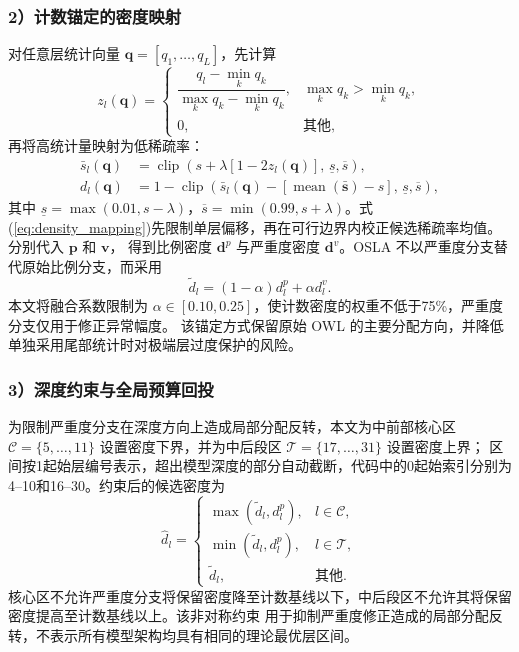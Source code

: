 \documentclass[UTF8,fontset=fandol]{ctexart}
\begin{document}
\subsubsection*{2）计数锚定的密度映射}

对任意层统计向量 $\bm q=[q_1,\ldots,q_L]$，先计算
\begin{equation}
z_l(\bm q)=
\begin{cases}
\dfrac{q_l-\min_k q_k}{\max_k q_k-\min_k q_k},
& \max_k q_k>\min_k q_k,\\[6pt]
0,&\text{其他},
\end{cases}
\label{eq:minmax}
\end{equation}
再将高统计量映射为低稀疏率：
\begin{equation}
\begin{aligned}
\bar s_l(\bm q)
&=\operatorname{clip}\!\left(
s+\lambda[1-2z_l(\bm q)],\,
\underline s,\overline s\right),\\
d_l(\bm q)&=
1-\operatorname{clip}\!\left(
\bar s_l(\bm q)-[\operatorname{mean}(\bar{\bm s})-s],\,
\underline s,\overline s\right),
\end{aligned}
\label{eq:density_mapping}
\end{equation}
其中 $\underline s=\max(0.01,s-\lambda)$，$\overline s=\min(0.99,s+\lambda)$。式
(\ref{eq:density_mapping})先限制单层偏移，再在可行边界内校正候选稀疏率均值。分别代入 $\bm p$ 和 $\bm v$，
得到比例密度 $\bm d^p$ 与严重度密度 $\bm d^v$。OSLA 不以严重度分支替代原始比例分支，而采用
\begin{equation}
\widetilde d_l=(1-\alpha)d_l^p+\alpha d_l^v .
\label{eq:fusion}
\end{equation}
本文将融合系数限制为 $\alpha\in[0.10,0.25]$，使计数密度的权重不低于75\%，严重度分支仅用于修正异常幅度。
该锚定方式保留原始 OWL 的主要分配方向，并降低单独采用尾部统计时对极端层过度保护的风险。

\subsubsection*{3）深度约束与全局预算回投}

为限制严重度分支在深度方向上造成局部分配反转，本文为中前部核心区
$\mathcal C=\{5,\ldots,11\}$ 设置密度下界，并为中后段区 $\mathcal T=\{17,\ldots,31\}$ 设置密度上界；
区间按1起始层编号表示，超出模型深度的部分自动截断，代码中的0起始索引分别为4--10和16--30。约束后的候选密度为
\begin{equation}
\widehat d_l=
\begin{cases}
\max(\widetilde d_l,d_l^p), & l\in\mathcal C,\\
\min(\widetilde d_l,d_l^p), & l\in\mathcal T,\\
\widetilde d_l, & \text{其他}.
\end{cases}
\label{eq:depth_constraints}
\end{equation}
核心区不允许严重度分支将保留密度降至计数基线以下，中后段区不允许其将保留密度提高至计数基线以上。该非对称约束
用于抑制严重度修正造成的局部分配反转，不表示所有模型架构均具有相同的理论最优层区间。
\end{document}
